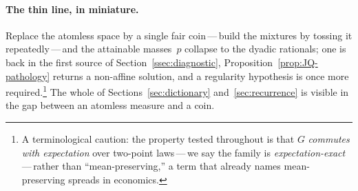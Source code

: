 \documentclass{article}
\theoremstyle{plain}
\theoremstyle{definition}
\begin{document}
\paragraph{The thin line, in miniature.}
Replace the atomless space by a single fair coin\,---\,build the
mixtures by tossing it repeatedly\,---\,and the attainable masses~$p$
collapse to the dyadic rationals; one is back in the first source of
Section~\ref{ssec:diagnostic}, Proposition~\ref{prop:JQ-pathology}
returns a non-affine solution, and a regularity hypothesis is once
more required.\footnote{A terminological caution: the property tested
throughout is that $G$ \emph{commutes with expectation} over
two-point laws\,---\,we say the family is
\emph{expectation-exact}\,---\,rather than ``mean-preserving,'' a
term that already names mean-preserving spreads in economics.} The
whole of Sections~\ref{sec:dictionary} and~\ref{sec:recurrence} is
visible in the gap between an atomless measure and a coin.
\end{document}
